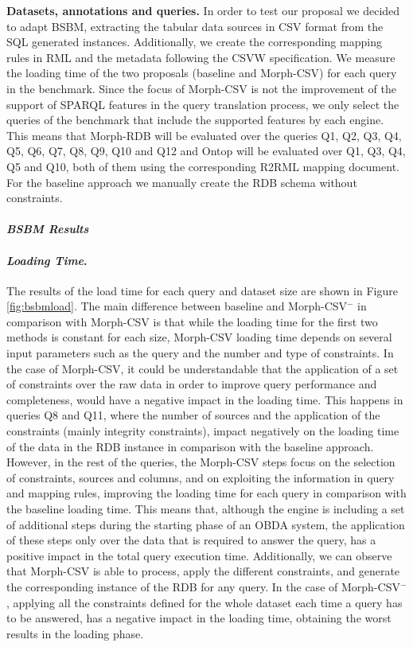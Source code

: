  
\noindent\textbf{Datasets, annotations and queries.} In order to test our proposal we decided to adapt BSBM, extracting the tabular data sources in CSV format from the SQL generated instances. Additionally, we create the corresponding mapping rules in RML and the metadata following the CSVW specification. We measure the loading time of the two proposals (baseline and Morph-CSV) for each query in the benchmark. Since the focus of Morph-CSV is not the improvement of the support of SPARQL features in the query translation process, we only select the queries of the benchmark that include the supported features  by each engine. This means that Morph-RDB will be evaluated over the queries  Q1, Q2, Q3, Q4, Q5, Q6, Q7, Q8, Q9, Q10 and Q12  and Ontop will be evaluated over Q1, Q3, Q4, Q5 and Q10, both of them using the corresponding R2RML mapping document. For the baseline approach we manually create the RDB schema without  constraints.



\noindent\paragraph*{\textit{BSBM Results}}

\noindent\paragraph*{\textit{Loading Time}.}
The results of the load time for each query and dataset size are shown in Figure \ref{fig:bsbmload}. The main difference between baseline and Morph-CSV$^-$ in comparison with Morph-CSV is that while the loading time for the first two methods is constant for each size, Morph-CSV loading time depends on several input parameters such as the query and the number and type of constraints. In the case of Morph-CSV, it could be understandable that the application of a set of constraints over the raw data in order to improve query performance and completeness, would have a negative impact in the loading time. This happens in queries Q8 and Q11, where the number of sources and the application of the constraints (mainly integrity constraints),  impact negatively on the loading time of the data in the RDB instance in comparison with the baseline approach. However, in the rest of the queries, the Morph-CSV steps focus on the selection of constraints, sources and columns, and on exploiting the information in query and mapping rules, improving the loading time for each query in comparison with the baseline loading time. This means that, although the engine is including a set of additional steps during the starting phase of an OBDA system, the application of these steps only over the data that is required to answer the query, has a positive impact in the total query execution time. Additionally, we can observe that Morph-CSV is able to process, apply the different constraints, and generate the corresponding instance of the RDB for any query. In the case of Morph-CSV$^-$, applying all the constraints defined for the whole dataset each time a query has to be answered, has a negative impact in the loading time, obtaining the worst results in the loading phase.

